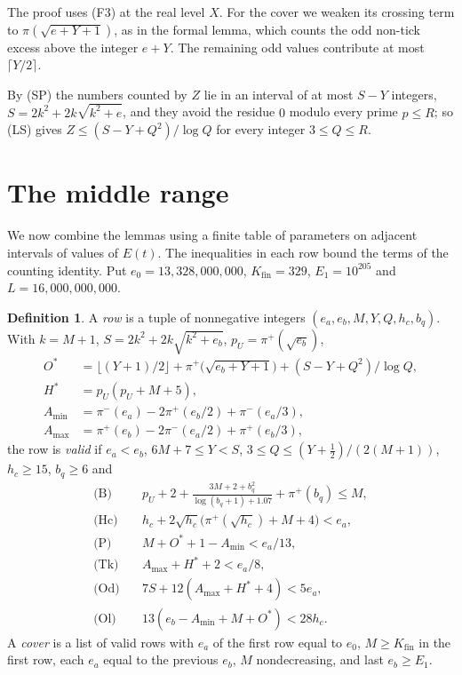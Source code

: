 \documentclass[11pt]{article}
\theoremstyle{definition}
\newtheorem{definition}[theorem]{Definition}
\theoremstyle{remark}
\newcommand{\piU}{\pi^{+}}
\newcommand{\piL}{\pi^{-}}
\begin{document}
The proof uses (F3) at the real level $X$. For the cover we weaken its
crossing term to $\pi(\sqrt{e+Y+1})$, as in the formal lemma, which
counts the odd non-tick excess above the integer $e+Y$. The remaining odd
values contribute at most $\lceil Y/2\rceil$.

By (SP) the numbers counted by $Z$ lie in an interval of at most
$S-Y$ integers, $S=2k^2+2k\sqrt{k^2+e}$, and they avoid the residue $0$
modulo every prime $p\le R$; so (LS) gives $Z\le(S-Y+Q^2)/\log Q$ for
every integer $3\le Q\le R$.

\section{The middle range}\label{sec:middle}

We now combine the lemmas using a finite table of parameters on adjacent
intervals of values of $E(t)$. The inequalities in each row bound the
terms of the counting identity. Put $e_0=13{,}328{,}000{,}000$,
$K_{\mathrm{fin}}=329$, $E_1=10^{205}$ and $L=16{,}000{,}000{,}000$.

\begin{definition}\label{def:cover}
A \emph{row} is a tuple of nonnegative integers
$(e_a,e_b,M,Y,Q,h_c,b_q)$. With $k=M+1$, $S=2k^2+2k\sqrt{k^2+e_b}$,
$p_U=\piU(\sqrt{e_b})$,
\begin{align*}
O^*&=\lfloor (Y+1)/2\rfloor+\piU\bigl(\sqrt{e_b+Y+1}\bigr)+(S-Y+Q^2)/\log Q,\\
H^*&=p_U(p_U+M+5),\\
A_{\min}&=\piL(e_a)-2\piU(e_b/2)+\piL(e_a/3),\\
A_{\max}&=\piU(e_b)-2\piL(e_a/2)+\piU(e_b/3),
\end{align*}
the row is \emph{valid} if $e_a<e_b$, $6M+7\le Y<S$,
$3\le Q\le(Y+\frac12)/(2(M+1))$, $h_c\ge15$, $b_q\ge6$ and
\begin{align*}
\text{(B)}&\quad p_U+2+\frac{3M+2+b_q^2}{\log(b_q+1)+1.07}+\piU(b_q)\le M,\\
\text{(Hc)}&\quad h_c+2\sqrt{h_c}\bigl(\piU(\sqrt{h_c})+M+4\bigr)<e_a,\\
\text{(P)}&\quad M+O^*+1-A_{\min}<e_a/13,\\
\text{(Tk)}&\quad A_{\max}+H^*+2<e_a/8,\\
\text{(Od)}&\quad 7S+12(A_{\max}+H^*+4)<5e_a,\\
\text{(Ol)}&\quad 13(e_b-A_{\min}+M+O^*)<28h_c .
\end{align*}
A \emph{cover} is a list of valid rows with $e_a$ of the first row equal
to $e_0$, $M\ge K_{\mathrm{fin}}$ in the first row, each $e_a$ equal to
the previous $e_b$, $M$ nondecreasing, and last $e_b\ge E_1$.
\end{definition}
\end{document}
